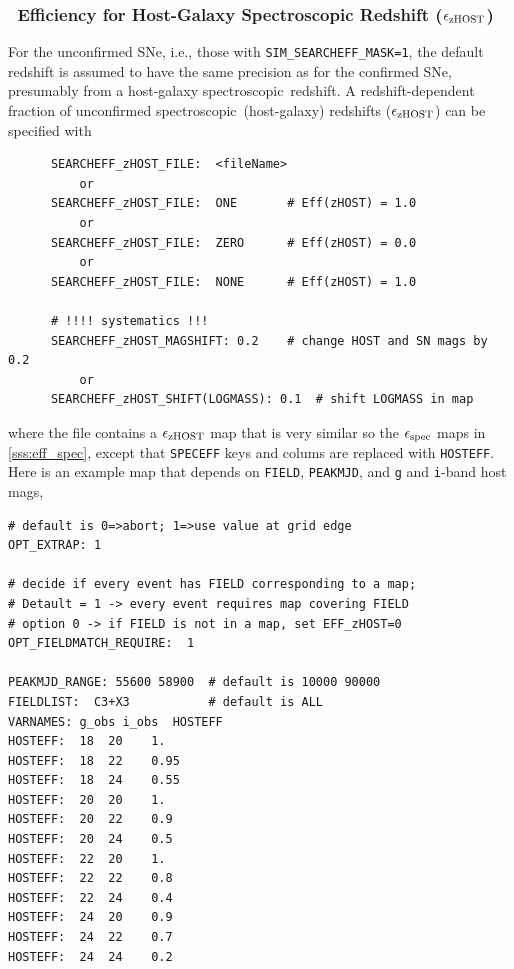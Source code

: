 \documentclass[12pt]{article}
\newcommand{\simeffspec}{\epsilon_{\rm spec}}
\newcommand{\simeffzhost}{\epsilon_{\rm zHOST}}
\newcommand{\spec}{spectroscopic}
\begin{document}
{%
\subsubsection{\Nospec\ Efficiency for Host-Galaxy Spectroscopic Redshift ($\simeffzhost$) }
\label{sss:eff_zHOST}

For the unconfirmed SNe, i.e., those with \verb|SIM_SEARCHEFF_MASK=1|,
the default redshift is assumed to have the same precision as for 
the confirmed SNe, presumably from a host-galaxy \spec\ redshift. 
A redshift-dependent fraction of unconfirmed 
\spec\ (host-galaxy) redshifts ($\simeffzhost$) can be specified with
%
\begin{verbatim}
      SEARCHEFF_zHOST_FILE:  <fileName>
          or
      SEARCHEFF_zHOST_FILE:  ONE       # Eff(zHOST) = 1.0
          or
      SEARCHEFF_zHOST_FILE:  ZERO      # Eff(zHOST) = 0.0
          or
      SEARCHEFF_zHOST_FILE:  NONE      # Eff(zHOST) = 1.0

      # !!!! systematics !!!
      SEARCHEFF_zHOST_MAGSHIFT: 0.2    # change HOST and SN mags by 0.2
          or
      SEARCHEFF_zHOST_SHIFT(LOGMASS): 0.1  # shift LOGMASS in map
\end{verbatim}
%
where the file contains a $\simeffzhost$ map that is very similar
so the $\simeffspec$ maps in \ref{sss:eff_spec}, except that 
\verb|SPECEFF| keys and colums are replaced with \verb|HOSTEFF|.
Here is an example map that depends on 
\verb|FIELD|,  \verb|PEAKMJD|, and {\tt g} and {\tt i}-band host mags,
%
\begin{Verbatim}[frame=single]
# default is 0=>abort; 1=>use value at grid edge
OPT_EXTRAP: 1               

# decide if every event has FIELD corresponding to a map;
# Detault = 1 -> every event requires map covering FIELD
# option 0 -> if FIELD is not in a map, set EFF_zHOST=0
OPT_FIELDMATCH_REQUIRE:  1  

PEAKMJD_RANGE: 55600 58900  # default is 10000 90000
FIELDLIST:  C3+X3           # default is ALL
VARNAMES: g_obs i_obs  HOSTEFF
HOSTEFF:  18  20    1.
HOSTEFF:  18  22    0.95
HOSTEFF:  18  24    0.55
HOSTEFF:  20  20    1.
HOSTEFF:  20  22    0.9
HOSTEFF:  20  24    0.5
HOSTEFF:  22  20    1.
HOSTEFF:  22  22    0.8
HOSTEFF:  22  24    0.4
HOSTEFF:  24  20    0.9
HOSTEFF:  24  22    0.7
HOSTEFF:  24  24    0.2


\end{Verbatim}}
\end{document}
